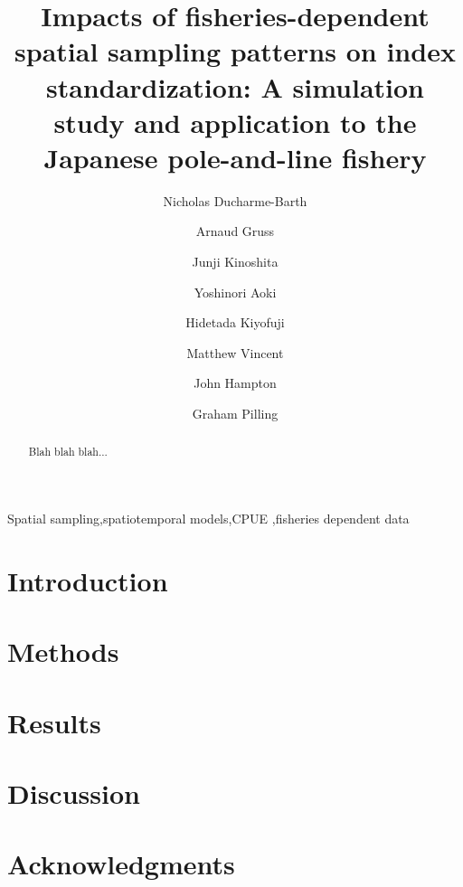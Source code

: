 \documentclass[authoryear,preprint,review,12pt]{elsarticle}
\begin{document}
\begin{frontmatter}

\title{Impacts of fisheries-dependent spatial sampling patterns on index standardization: A simulation study and application to the Japanese pole-and-line fishery}


\author[address.1]{Nicholas Ducharme-Barth}
\author[address.2]{Arnaud Gruss}
\author[address.3]{Junji Kinoshita}
\author[address.4]{Yoshinori Aoki}
\author[address.4]{Hidetada Kiyofuji}
\author[address.1]{Matthew Vincent}
\author[address.1]{John Hampton}
\author[address.1]{Graham Pilling}

\address[address.1]{Pacific Community, B.P. D5 98848 Noumea, New Caledonia}
\address[address.2]{School of Aquatic and Fishery Sciences, University of Washington, Box 355020, Seattle, WA, 98105-5020, USA}
\address[address.3]{National Research Institute of Far Seas Fisheries, Japan Fisheries Research and Education Agency, Yokohama, Kanagawa, Japan}
\address[address.4]{National Research Institute of Far Seas Fisheries, Japan Fisheries Research and Education Agency, Shimizu-ku, Shizuoka-shi, Shizuoka 424-8633 Japan}

\begin{abstract}
Blah blah blah...
\end{abstract}

\begin{keyword}
Spatial sampling\sep spatiotemporal models\sep CPUE \sep fisheries dependent data
\end{keyword}

\end{frontmatter}

\linenumbers

\section{Introduction}\label{Intro}

\section{Methods}\label{Methods}

\section{Results}\label{Results}

\section{Discussion}\label{Discussion}

\section{Acknowledgments}\label{Ack}


\end{document}
